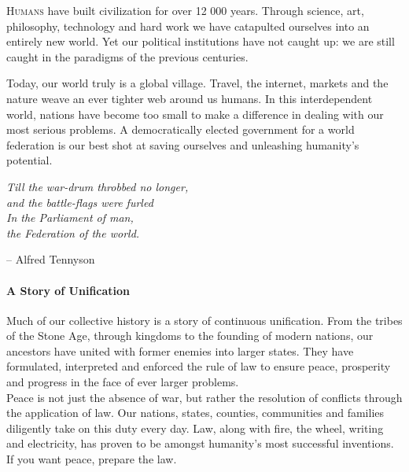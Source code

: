 \documentclass[11pt,a4paper]{article}
\begin{document}
\begin{multicols}{2}
\lettrine[lraise=0.1, lines=2]{\textsc{H}}{umans} have built civilization for over 12 000 years. Through science, art, philosophy, technology and hard work we have catapulted ourselves into an entirely new world. Yet our political institutions have not caught up: we are still caught in the paradigms of the previous centuries.

\noindent Today, our world truly is a global village. Travel, the internet, markets and the nature weave an ever tighter web around us humans. In this interdependent world, nations have become too small to make a difference in dealing with our most serious problems. A democratically elected government for a world federation is our best shot at saving ourselves and unleashing humanity’s potential.


\begin{shaded*}
\noindent \textit{Till the war-drum throbbed no longer,\\
and the battle-flags were furled\\
\noindent In the Parliament of man, \\
the Federation of the world.}
\begin{flushright}
-- Alfred Tennyson
\end{flushright}
\vspace{-12pt}
\end{shaded*}


\paragraph{A Story of Unification}

Much of our collective history is a story of continuous unification.
From the tribes of the Stone Age, through kingdoms to the founding of modern nations, our ancestors have united with former enemies into larger states.
They have formulated, interpreted and enforced the rule of law to ensure peace, prosperity and progress in the face of ever larger problems.\\
\noindent Peace is not just the absence of war, but rather the resolution of conflicts through the application of law.
Our nations, states, counties, communities and families diligently take on this duty every day.
Law, along with fire, the wheel, writing and electricity, has proven to be amongst humanity's most successful inventions.
If you want peace, prepare the law.


\end{multicols}
\end{document}
